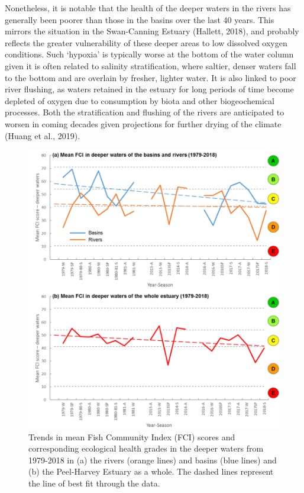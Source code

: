 \documentclass[
]{book}
\begin{document}
Nonetheless, it is notable that the health of the deeper waters in the rivers has generally been poorer than those in the basins over the last 40 years. This mirrors the situation in the Swan-Canning Estuary (Hallett, 2018), and probably reflects the greater vulnerability of these deeper areas to low dissolved oxygen conditions. Such `hypoxia' is typically worse at the bottom of the water column given it is often related to salinity stratification, where saltier, denser waters fall to the bottom and are overlain by fresher, lighter water. It is also linked to poor river flushing, as waters retained in the estuary for long periods of time become depleted of oxygen due to consumption by biota and other biogeochemical processes. Both the stratification and flushing of the rivers are anticipated to worsen in coming decades given projections for further drying of the climate (Huang et al., 2019).

\begin{figure}
\includegraphics[width=0.95\linewidth]{images/fish_ecology/picture8} \caption{Trends in mean Fish Community Index (FCI) scores and corresponding ecological health grades in the deeper waters from 1979-2018 in (a) the rivers (orange lines) and basins (blue lines) and (b) the Peel-Harvey Estuary as a whole. The dashed lines represent the line of best fit through the data.}\label{fig:fish-ecology-pic8}
\end{figure}
\end{document}
